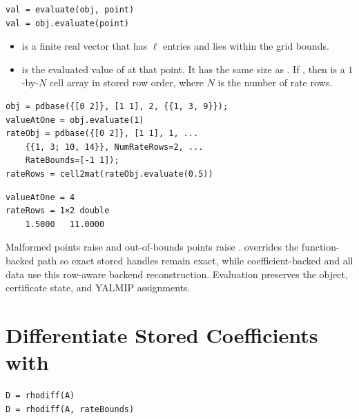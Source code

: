 \syntaxhead
\begin{lstlisting}[style=dpsyntax]
val = evaluate(obj, point)
val = obj.evaluate(point)
\end{lstlisting}

\arghead
\begin{itemize}
\item {} is a finite real vector that has $\ell$ entries and lies within the grid bounds.
\item {} is the evaluated value of  at that point. It has the same size as . If , then  is a $1$-by-$N$ cell array in stored row order, where $N$ is the number of rate rows.
\end{itemize}

\examplehead
\begin{lstlisting}[style=dpmatlab]
obj = pdbase({[0 2]}, [1 1], 2, {{1, 3, 9}});
valueAtOne = obj.evaluate(1)
rateObj = pdbase({[0 2]}, [1 1], 1, ...
    {{1, 3; 10, 14}}, NumRateRows=2, ...
    RateBounds=[-1 1]);
rateRows = cell2mat(rateObj.evaluate(0.5))
\end{lstlisting}
\begin{lstlisting}[style=dpoutput]
valueAtOne = 4
rateRows = 1×2 double
    1.5000   11.0000
\end{lstlisting}

\remarkshead
Malformed points raise  and out-of-bounds points raise .  overrides the function-backed path so exact stored handles remain exact, while coefficient-backed  and all  data use this row-aware backend reconstruction. Evaluation preserves the object, certificate state, and YALMIP assignments.

\section{Differentiate Stored Coefficients with \texorpdfstring{}{rhodiff}}
\label{sec:pdbase-rhodiff}

\syntaxhead
\begin{lstlisting}[style=dpsyntax]
D = rhodiff(A)
D = rhodiff(A, rateBounds)
\end{lstlisting}

